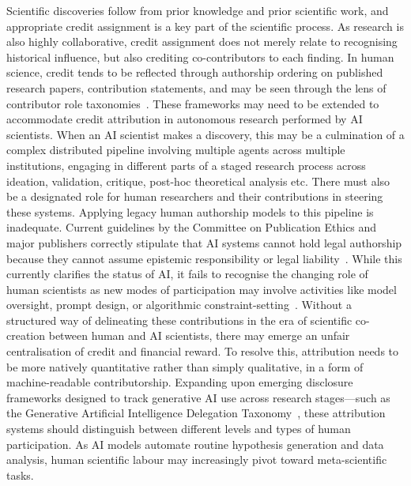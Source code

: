 \documentclass[11pt, a4paper, twocolumn, goog]{google}
\begin{document}
Scientific discoveries follow from prior knowledge and prior scientific work, and appropriate credit assignment is a key part of the scientific process. As research is also highly collaborative, credit assignment does not merely relate to recognising historical influence, but also crediting co-contributors to each finding. In human science, credit tends to be reflected through authorship ordering on published research papers, contribution statements, and may be seen through the lens of contributor role taxonomies~\citep{allen2014publishing, brand2015beyond}. These frameworks may need to be extended to accommodate credit attribution in autonomous research performed by AI scientists. When an AI scientist makes a discovery, this may be a culmination of a complex distributed pipeline involving multiple agents across multiple institutions, engaging in different parts of a staged research process across ideation, validation, critique, post-hoc theoretical analysis etc. There must also be a designated role for human researchers and their contributions in steering these systems. Applying legacy human authorship models to this pipeline is inadequate. Current guidelines by the Committee on Publication Ethics and major publishers correctly stipulate that AI systems cannot hold legal authorship because they cannot assume epistemic responsibility or legal liability~\citep{hosseini2023ethics, cope_council_2024_authorship, akgun2025author}. While this currently clarifies the status of AI, it fails to recognise the changing role of human scientists as new modes of participation may involve activities like model oversight, prompt design, or algorithmic constraint-setting~\citep{akgun2025author}. Without a structured way of delineating these contributions in the era of scientific co-creation between human and AI scientists, there may emerge an unfair centralisation of credit and financial reward. To resolve this, attribution needs to be more natively quantitative rather than simply qualitative, in a form of machine-readable contributorship. Expanding upon emerging disclosure frameworks designed to track generative AI use across research stages—such as the Generative Artificial Intelligence Delegation Taxonomy~\citep{suchikova2026gaidet}, these attribution systems should distinguish between different levels and types of human participation. As AI models automate routine hypothesis generation and data analysis, human scientific labour may increasingly pivot toward meta-scientific tasks. 
\end{document}
